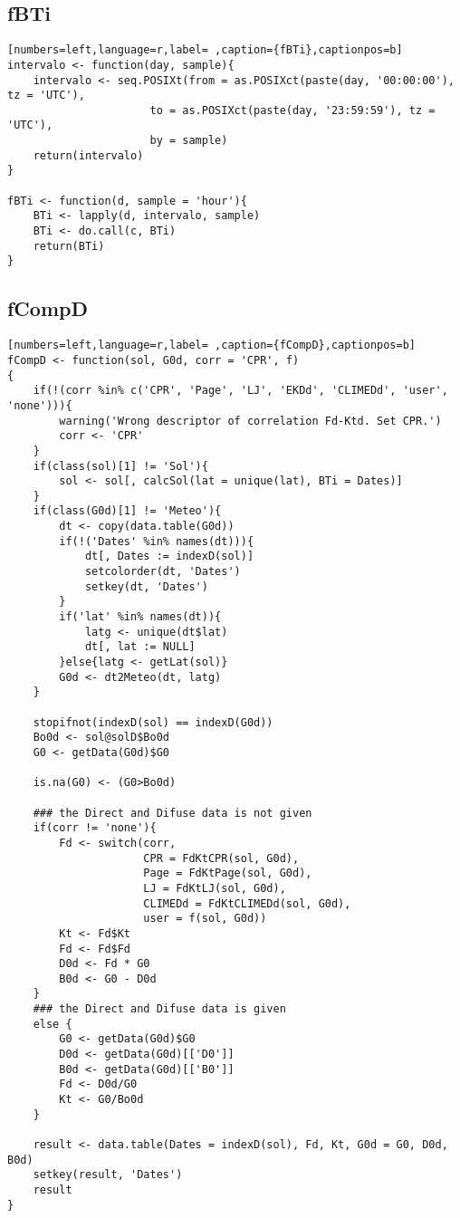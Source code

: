 \subsection{fBTi}
\label{sec:org14ab26f}
\begin{lstlisting}[numbers=left,language=r,label= ,caption={fBTi},captionpos=b]
intervalo <- function(day, sample){
    intervalo <- seq.POSIXt(from = as.POSIXct(paste(day, '00:00:00'), tz = 'UTC'),
                      to = as.POSIXct(paste(day, '23:59:59'), tz = 'UTC'),
                      by = sample)
    return(intervalo)
}

fBTi <- function(d, sample = 'hour'){
    BTi <- lapply(d, intervalo, sample)
    BTi <- do.call(c, BTi)
    return(BTi)
}
\end{lstlisting}
\subsection{fCompD}
\label{sec:org0dbd7b0}
\begin{lstlisting}[numbers=left,language=r,label= ,caption={fCompD},captionpos=b]
fCompD <- function(sol, G0d, corr = 'CPR', f)
{
    if(!(corr %in% c('CPR', 'Page', 'LJ', 'EKDd', 'CLIMEDd', 'user', 'none'))){
        warning('Wrong descriptor of correlation Fd-Ktd. Set CPR.')
        corr <- 'CPR'
    }
    if(class(sol)[1] != 'Sol'){
        sol <- sol[, calcSol(lat = unique(lat), BTi = Dates)]
    }
    if(class(G0d)[1] != 'Meteo'){
        dt <- copy(data.table(G0d))
        if(!('Dates' %in% names(dt))){
            dt[, Dates := indexD(sol)]
            setcolorder(dt, 'Dates')
            setkey(dt, 'Dates')
        }
        if('lat' %in% names(dt)){
            latg <- unique(dt$lat)
            dt[, lat := NULL]
        }else{latg <- getLat(sol)}
        G0d <- dt2Meteo(dt, latg)
    }  

    stopifnot(indexD(sol) == indexD(G0d))
    Bo0d <- sol@solD$Bo0d
    G0 <- getData(G0d)$G0

    is.na(G0) <- (G0>Bo0d)

    ### the Direct and Difuse data is not given
    if(corr != 'none'){
        Fd <- switch(corr,
                     CPR = FdKtCPR(sol, G0d),
                     Page = FdKtPage(sol, G0d),
                     LJ = FdKtLJ(sol, G0d),
                     CLIMEDd = FdKtCLIMEDd(sol, G0d),
                     user = f(sol, G0d))
        Kt <- Fd$Kt
        Fd <- Fd$Fd
        D0d <- Fd * G0
        B0d <- G0 - D0d
    }
    ### the Direct and Difuse data is given
    else {
        G0 <- getData(G0d)$G0
        D0d <- getData(G0d)[['D0']]
        B0d <- getData(G0d)[['B0']]
        Fd <- D0d/G0
        Kt <- G0/Bo0d
    }

    result <- data.table(Dates = indexD(sol), Fd, Kt, G0d = G0, D0d, B0d)
    setkey(result, 'Dates')
    result
}
\end{lstlisting}
